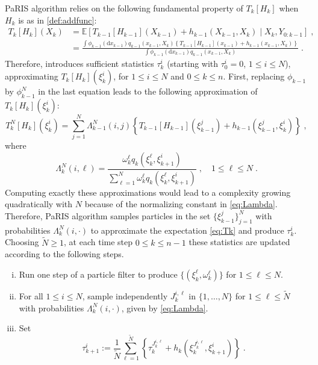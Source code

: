 \documentclass[12pt]{article}
\newcommand{\rmd}{\mathrm{d}}
\newcommand{\eqsp}{\;}
\newcommand{\1}{\mathrm{1}}
\newcommand{\qk}{q_{k}}
\begin{document}
PaRIS algorithm relies on the following fundamental property of $T_k[H_k]$ when $H_k$ is as in \eqref{def:addfunc}:
\begin{align*}
T_k[H_k](X_k) &=\mathbb{E}\left[T_{k-1}[H_{k-1}](X_{k-1}) + h_{k-1}(X_{k-1},X_k)\middle|X_k,Y_{0:k-1} \right]\eqsp,\\
&= \frac{\int \phi_{k-1}(\rmd x_{k-1})q_{k-1}(x_{k-1},X_k)\left\{T_{k-1}[H_{k-1}](x_{k-1}) + h_{k-1}(x_{k-1},X_k)\right\}}{\int \phi_{k-1}(\rmd x_{k-1})q_{k-1}(x_{k-1},X_k)}\eqsp.
\end{align*}
Therefore, \cite{olsson:westerborn:2016} introduces sufficient statistics $\tau^i_k$ (starting with $\tau^i_0 = 0$, $1\le i\le N$), approximating $T_k[H_k](\xi^i_k)$, for $1\le i\le N$ and $0\le k \le n$. First, replacing $\phi_{k-1}$ by $\phi^N_{k-1}$ in the last equation leads to the following approximation of $T_k[H_k](\xi^i_k)$:
\begin{equation}
\label{eq:Tk}
T_k^N[H_k](\xi_k^i) = \sum_{j=1}^N \Lambda_{k-1}^N(i,j)\left\{T_{k-1}[H_{k-1}](\xi_{k-1}^j) + h_{k-1}(\xi^j_{k-1},\xi^i_k)\right\}\eqsp, 
\end{equation}
where
\begin{equation}
\label{eq:Lambda}
\Lambda_{k}^N(i,\ell) = \frac{\omega^{\ell}_{k} \qk(\xi^{\ell}_{k},\xi_{k+1}^{i})}{\sum_{\ell=1}^N\omega^{\ell}_{k} \qk(\xi^{\ell}_{k},\xi_{k+1}^{i})}\eqsp,\quad 1\le \ell\le N\eqsp.
\end{equation}
Computing exactly these approximations would lead to a complexity growing quadratically with $N$ because of the normalizing constant in \eqref{eq:Lambda}. Therefore, PaRIS algorithm samples particles in the set $\{\xi^j_{k-1}\}_{j=1}^N$ with probabilities $\Lambda_{k}^N(i,\cdot)$ to approximate the expectation \eqref{eq:Tk} and produce $\tau^i_k$.
Choosing $\tilde{N}\ge 1$, at each time step $0\le k \le {n-1}$ these statistics are updated according to the following steps.
\begin{enumerate}[(i)]
\item \label{it:PaRIS:filt} Run one step of a particle filter to produce $\{(\xi^{\ell}_k, \omega^{\ell}_k)\}$ for $1\le \ell \le N$.
\item \label{it:PaRIS:sampleindex} For all $1\le i \le N$, sample independently $J_{k}^{i,\ell}$ in $\{1,\ldots,N\}$ for $1\le \ell \le \widetilde N$ with probabilities $\Lambda_{k}^N(i,\cdot)$, given by \eqref{eq:Lambda}.
\item \label{it:PaRIS:smooth} Set
\[
\tau^{i}_{k+1} := \frac{1}{\widetilde{N}} \sum^{\widetilde{N}}_{\ell=1} \left\{ \tau^{J_{k}^{i,\ell}}_{k} + h_{k} \left(\xi^{J_{k}^{i,\ell}}_{k}, \xi^{i}_{k+1}\right)  \right\}\eqsp.
\]
\end{enumerate}
\end{document}
